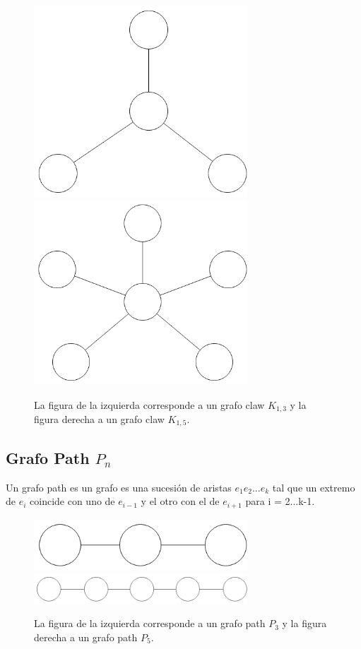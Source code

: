 \begin{figure}[H]
\includegraphics[width=80mm]{K1_3.png}
\includegraphics[width=80mm]{K1_5.png}
\caption{La figura de la izquierda corresponde a un grafo claw $K_{1,3}$ y la figura derecha a un grafo claw $K_{1,5}$.}
\label{overflow}
\end{figure}

\subsection{Grafo Path $P_n$}
Un grafo path es un grafo es una sucesión de aristas $e_1e_2$...$e_k$ tal que un extremo de $e_i$ coincide con uno de $e_{i-1}$ y el otro con el de $e_{i+1}$ para i = 2...k-1.

\begin{figure}[H]
\includegraphics[width=80mm]{P3.png}
\includegraphics[width=80mm]{P5.png}
\caption{La figura de la izquierda corresponde a un grafo path $P_3$ y la figura derecha a un grafo path $P_5$.}
\label{overflow}
\end{figure}

